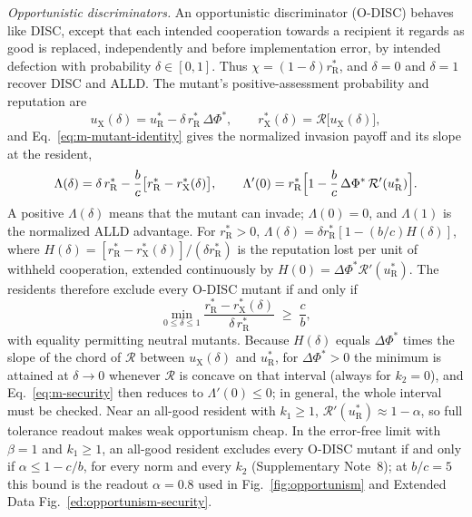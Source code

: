 \textit{Opportunistic discriminators.} An opportunistic discriminator (O-DISC)
behaves like DISC, except that each intended cooperation towards a recipient it
regards as good is replaced, independently and before implementation error, by
intended defection with probability $\delta\in[0,1]$. Thus
$\chi=(1-\delta)r^*_{\mathrm R}$, and $\delta=0$ and $\delta=1$ recover DISC and
ALLD. The mutant's positive-assessment probability and reputation are
\begin{equation}
u_{\mathrm X}(\delta)=u^*_{\mathrm R}-\delta\,r^*_{\mathrm R}\,\Delta\Phi^*,
\qquad
r^*_{\mathrm X}(\delta)=\mathcal R\bigl[u_{\mathrm X}(\delta)\bigr],
\label{eq:m-odisc-reputation}
\end{equation}
and Eq.~\eqref{eq:m-mutant-identity} gives the normalized invasion payoff and
its slope at the resident,
\begin{equation}
\Lambda(\delta)=\delta\,r^*_{\mathrm R}
-\frac{b}{c}\bigl[r^*_{\mathrm R}-r^*_{\mathrm X}(\delta)\bigr],
\qquad
\Lambda'(0)=r^*_{\mathrm R}\Bigl[1-\frac{b}{c}\,\Delta\Phi^*\,
\mathcal R'(u^*_{\mathrm R})\Bigr].
\label{eq:m-odisc-invasion}
\end{equation}
A positive $\Lambda(\delta)$ means that the mutant can invade; $\Lambda(0)=0$,
and $\Lambda(1)$ is the normalized ALLD advantage. For $r^*_{\mathrm R}>0$,
$\Lambda(\delta)=\delta r^*_{\mathrm R}[1-(b/c)H(\delta)]$, where
$H(\delta)=[r^*_{\mathrm R}-r^*_{\mathrm X}(\delta)]/(\delta r^*_{\mathrm R})$ is the
reputation lost per unit of withheld cooperation, extended continuously by
$H(0)=\Delta\Phi^*\mathcal R'(u^*_{\mathrm R})$. The residents therefore exclude
every O-DISC mutant if and only if
\begin{equation}
\min_{0\le\delta\le1}\frac{r^*_{\mathrm R}-r^*_{\mathrm X}(\delta)}{\delta\,r^*_{\mathrm R}}
\;\ge\;\frac{c}{b},
\label{eq:m-security}
\end{equation}
with equality permitting neutral mutants. Because $H(\delta)$ equals
$\Delta\Phi^*$ times the slope of the chord of $\mathcal R$ between
$u_{\mathrm X}(\delta)$ and $u^*_{\mathrm R}$, for $\Delta\Phi^*>0$ the minimum
is attained at $\delta\to0$ whenever $\mathcal R$ is concave on that interval
(always for $k_2=0$), and Eq.~\eqref{eq:m-security} then reduces to
$\Lambda'(0)\le0$; in general, the whole interval must be checked. Near an
all-good resident with $k_1\ge1$, $\mathcal R'(u^*_{\mathrm R})\approx1-\alpha$,
so full tolerance readout makes weak opportunism cheap. In the error-free limit with $\beta=1$ and $k_1\ge1$, an
all-good resident excludes every O-DISC mutant if and only if
$\alpha\le1-c/b$, for every norm and every $k_2$ (Supplementary Note~8); at
$b/c=5$ this bound is the readout $\alpha=0.8$ used in Fig.~\ref{fig:opportunism}
and Extended Data Fig.~\ref{ed:opportunism-security}.

